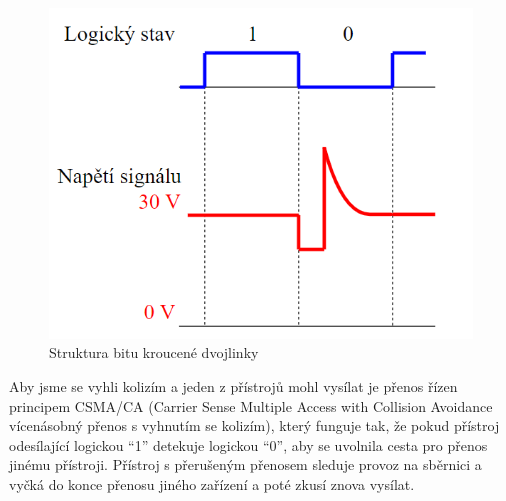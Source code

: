 \begin{figure}[!h]
  \begin{center}
    \includegraphics[scale=0.7]{obrazky/Struktura bitu.png}
  \end{center}
  \caption[Struktura bitu kroucené dvojlinky \cite{Celkovy prehled}]{Struktura bitu kroucené dvojlinky \cite{Celkovy prehled}}
  \label{fig:Struktura bitu kroucené dvojlinky}
\end{figure}

Aby jsme se vyhli kolizím a jeden z přístrojů mohl vysílat je přenos řízen principem CSMA/CA (Carrier Sense Multiple Access with Collision Avoidance vícenásobný přenos s vyhnutím se kolizím), který funguje tak, že pokud přístroj odesílající logickou “1” detekuje logickou “0”, aby se uvolnila cesta pro přenos jinému přístroji. Přístroj s přerušeným přenosem sleduje provoz na sběrnici a vyčká do konce přenosu jiného zařízení a poté zkusí znova vysílat. \cite{Celkovy prehled}

